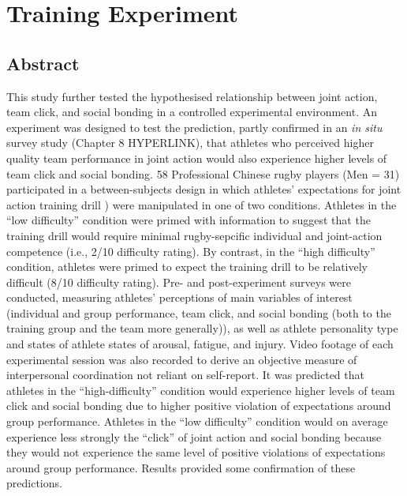 \chapter{\label{9trainingExperiment}Training Experiment}

\minitoc


\section{Abstract}
This study further tested the hypothesised relationship between joint action, team click, and social bonding in a controlled experimental environment.  An experiment was designed to test the prediction, partly confirmed in an \textit{in situ} survey study (Chapter 8 HYPERLINK), that athletes who perceived higher quality team performance in joint action would also experience higher levels of team click and social bonding.  58 Professional Chinese rugby players (Men = 31) participated in a between-subjects design in which athletes' expectations for joint action training drill \citep[``Invasion drill''][]{Passos2011}) were manipulated in one of two conditions.  Athletes in the ``low difficulty'' condition were primed with information to suggest that the training drill would require minimal rugby-sepcific individual and joint-action competence (i.e., 2/10 difficulty rating).  By contrast, in the ``high difficulty'' condition, athletes were primed to expect the training drill to be relatively difficult (8/10 difficulty rating). Pre- and post-experiment surveys were conducted, measuring athletes' perceptions of main variables of interest (individual and group performance, team click, and social bonding (both to the training group and the team more generally)), as well as athlete personality type and states of athlete states of arousal, fatigue, and injury.  Video footage of each experimental session was also recorded to derive an objective measure of interpersonal coordination not reliant on self-report. It was predicted that athletes in the ``high-difficulty'' condition would experience higher levels of team click and social bonding due to higher positive violation of expectations around group performance.  Athletes in the ``low difficulty'' condition would on average experience less strongly the ``click'' of joint action and social bonding because they would not experience the same level of positive violations of expectations around group performance.  Results provided some confirmation of these predictions.


